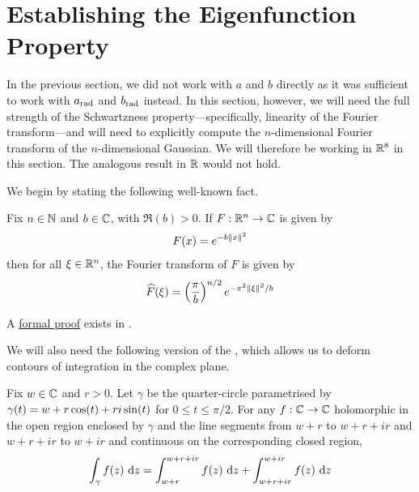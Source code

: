 \section{Establishing the Eigenfunction Property}
\label{Ch4:Sec:Eig}


In the previous section, we did not work with $a$ and $b$ directly as it was sufficient to work with $a_{\operatorname{rad}}$ and $b_{\operatorname{rad}}$ instead. In this section, however, we will need the full strength of the Schwartzness property---specifically, linearity of the Fourier transform---and will need to explicitly compute the $n$-dimensional Fourier transform of the $n$-dimensional Gaussian. We will therefore be working in $\mathbb{R}^8$ in this section. The analogous result in $\mathbb{R}$ would not hold.

We begin by stating the following well-known fact.
\begin{boxtheorem}\label{Ch4:Thm:GaussianFourier}
    Fix $n \in \mathbb{N}$ and $b \in \mathbb{C}$, with $\Re(b) > 0$. If $F : \mathbb{R}^n \to \mathbb{C}$ is given by
    \begin{align*}
        F(x) = e^{-b \left\lVert x \right\rVert^2}
    \end{align*}
    then for all $\xi \in \mathbb{R}^n$, the Fourier transform of $F$ is given by
    \begin{align*}
        \widehat{F}\!\left( \xi \right) = \left( \frac{\pi}{b} \right)^{{n} / {2}} e^{{- \pi^2 \left\lVert \xi \right\rVert^2} / {b}}
    \end{align*}
\end{boxtheorem}
A \href{https://github.com/leanprover-community/mathlib4/blob/5a2eaa85c555c4263e15928cef249cbaad2eb2d2/Mathlib/Analysis/SpecialFunctions/Gaussian/FourierTransform.lean#L360-L363}{formal proof} exists in \mathlib.

We will also need the following version of the \CGT, which allows us to deform contours of integration in the complex plane.

\begin{boxtheorem}\label{Ch4:Thm:CGTRectCircle}
    Fix $w \in \mathbb{C}$ and $r > 0$. Let $\gamma$ be the quarter-circle parametrised by $\gamma(t) = w + r\cos\!{\left( t \right)} + r i \sin\!{\left( t \right)}$ for $0 \leq t \leq \pi/2$. For any $f : \mathbb{C} \to \mathbb{C}$ holomorphic in the open region enclosed by $\gamma$ and the line segments from $w + r$ to $w + r + ir$ and $w + r + ir$ to $w + ir$ and continuous on the corresponding closed region,
    \begin{align*}
        \int_{\gamma} f(z) \, \operatorname{d}\!{z}
        = \int_{w + r}^{w + r + ir} f(z) \, \operatorname{d}\!{z} + \int_{w + r + ir}^{w + ir} f(z) \, \operatorname{d}\!{z}
    \end{align*}
\end{boxtheorem}

